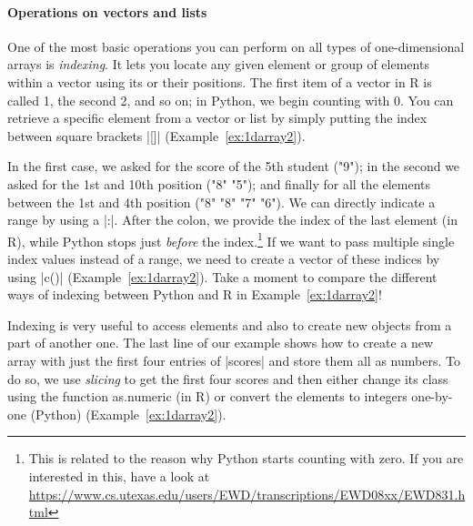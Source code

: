 \paragraph{Operations on vectors and lists}
One of the most
basic operations you can perform on all types of one-dimensional arrays
is \emph{indexing}. It lets you locate any given
element or group of elements within a vector using its or their
positions. The first item of a vector in R is called 1, the second 2, and so on;
in Python, we begin counting with 0.  You can retrieve a specific element
from a vector or list by simply putting the index between square brackets |[]| (Example~\ref{ex:1darray2}). %


In the first case, we asked for the score of the 5th student ("9");
in the second we asked for the 1st and 10th position ("8" "5"); and
finally for all the elements between the 1st and 4th position ("8"
"8" "7" "6"). We can directly indicate a range
by using a |:|. After the colon, we provide the index of
the last element (in R), while Python stops just \emph{before} the index.\footnote{This is related to the
reason why Python starts counting with zero. If you are interested
in this, have a look at \url{https://www.cs.utexas.edu/users/EWD/transcriptions/EWD08xx/EWD831.html}}
If we want to pass multiple single index values instead of a range,
we need to create a vector of these indices by using |c()| (Example~\ref{ex:1darray2}).
Take a moment to compare the different ways of indexing between Python
and R in Example~\ref{ex:1darray2}!

Indexing is very useful to access elements and also to
create new objects from a part of another one. The last line of our
example shows how to create a new array with just the first four
entries of |scores| and store them all as numbers. To do so, we
use \emph{slicing} to get the first four scores and then either change its class using the function
as.numeric (in R) or convert the elements to integers one-by-one (Python)  (Example~\ref{ex:1darray2}).



